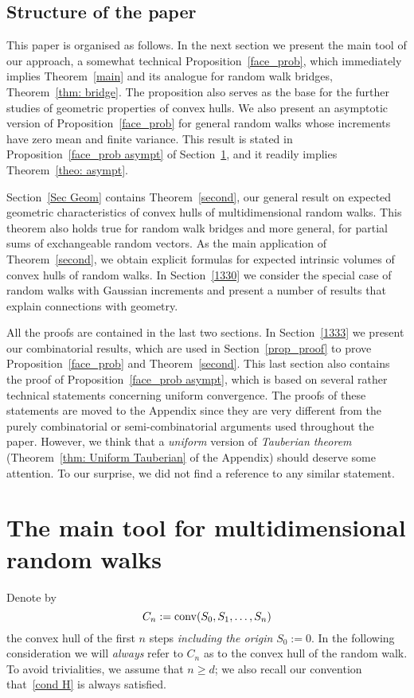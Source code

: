 \documentclass[12pt, reqno]{amsart}
\begin{document}
\subsection{Structure of the paper} This paper is organised as follows. In the next section we present the main tool of our approach, a somewhat technical Proposition~\ref{face_prob}, which immediately implies Theorem~\ref{main} and its analogue for random walk bridges, Theorem~\ref{thm: bridge}. The proposition also serves as the base for the further studies of geometric properties of convex hulls. We also present an asymptotic version of Proposition~\ref{face_prob} for general random walks whose increments have zero mean and finite variance. This result is stated in Proposition~\ref{face_prob asympt} of Section~\ref{1306}, and it readily implies Theorem~\ref{theo: asympt}. 

Section~\ref{Sec Geom} contains Theorem~\ref{second}, our general result on expected geometric characteristics of convex hulls of  multidimensional random walks. This theorem also holds true for random walk bridges and more general, for partial sums of exchangeable random vectors. As the main application of Theorem~\ref{second}, we obtain explicit formulas for expected intrinsic volumes of convex hulls of random walks. In Section~\ref{1330} we consider the special case of random walks with Gaussian increments and present a number of results that explain connections with geometry. 

All the proofs are contained in the last two sections. In Section~\ref{1333} we present our combinatorial results, which are used in Section~\ref{prop_proof} to prove Proposition~\ref{face_prob} and Theorem~\ref{second}. This last section also contains the proof of  Proposition~\ref{face_prob asympt}, which is based on several rather technical statements concerning uniform convergence. The proofs of these statements are moved to the Appendix since they are very different from the purely combinatorial or semi-combinatorial arguments used throughout the paper. However, we think that a {\it uniform} version of {\it Tauberian theorem} (Theorem~\ref{thm: Uniform Tauberian} of the Appendix) should deserve some attention. To our surprise, we did not find a reference to any similar statement.

\section{The main tool for multidimensional random walks}\label{1306}
Denote by
$$
C_n:=\mathop{\mathrm{conv}}\nolimits(S_0,S_1,\dots, S_n)
$$
the convex hull of the first $n$ steps \emph{including the origin} $S_0:=0$. In the following consideration we will {\it always} refer to $C_n$ as to the convex hull of the random walk. To avoid trivialities, we assume that $n \ge d$; we also recall our convention that~\eqref{cond H} is always satisfied. 
\end{document}
